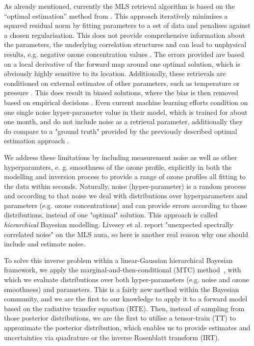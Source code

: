 As already mentioned, currently the MLS retrieval algorithm \cite{livesey2006retrieval} is based on the “optimal estimation” method from \cite{rodgers1976retrieval}.
This approach iteratively minimises a squared residual norm by fitting parameters to a set of data and penalises against a chosen regularisation.
This does not provide comprehensive information about the parameters, the underlying correlation structures and can lead to unphysical results, e.g. negative ozone concentration values \cite{MLSdata}.
The errors provided are based on a local derivative of the forward map around one optimal solution, which is obviously highly sensitive to its location.
Additionally, these retrievals are conditioned on external estimates of other parameters, such as temperature or pressure \cite{livesey2006retrieval}.
This does result in biased solutions, where the bias is then removed based on empirical decisions \cite{livesey2008ozonecarbonmono, Froidevaux2008snrozone}.
Even current machine learning efforts condition on one single noise hyper-parameter value in their model, which is trained for about one month, and do not include noise as a retrieval parameter, additionally they do compare to a "ground truth" provided by the previously described optimal estimation approach \cite{werner2023machlearn, bojkov2008NeuralNet}.

We address these limitations by including measurement noise as well as other hyperparamters, e. g. smoothness of the ozone profile, explicitly in both the modelling and inversion process to provide a range of ozone profiles all fitting to the data within seconds.
Naturally, noise (hyper-parameter) is a random process and occording to that noise we deal with distributions over hyperparameters and parameters (e.g. ozone concentrations) and can provide errors according to those distributions, instead of one "optimal" solution.
This approach is called \textit{hierarchical} Bayesian modelling.
Livesey et al. \cite{livesey2006retrieval} report "unexpected spectrally correlated noise" on the MLS aura, so here is another real reason why one should include and estimate noise.

To solve this inverse problem within a linear-Gaussian hierarchical Bayesian framework, we apply the marginal-and-then-conditional (MTC) method~\cite{fox2016fast}, with which we evaluate distributions over both hyper-parameters (e.g. noise and ozone smoothness) and parameters.
This is a fairly new method within the Bayesian community, and we are the first to our knowledge to apply it to a forward model based on the radiative transfer equation (RTE).
Then, instead of sampling from those posterior distributions, we are the first to utilise a tensor-train (TT) to approximate the posterior distribution, which enables us to provide estimates and uncertainties via quadrature or the inverse Rosenblatt transform (IRT).

